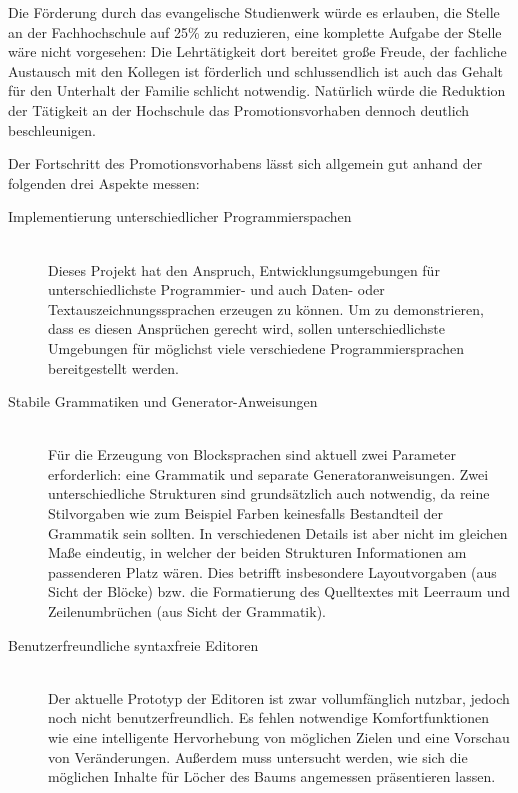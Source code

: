 \documentclass[paper=a4,fontsize=11pt,parskip=half]{scrartcl}
\begin{document}
Die Förderung durch das evangelische Studienwerk würde es erlauben, die Stelle an der Fachhochschule auf 25\% zu reduzieren, eine komplette Aufgabe der Stelle wäre nicht vorgesehen: Die Lehrtätigkeit dort bereitet große Freude, der fachliche Austausch mit den Kollegen ist förderlich und schlussendlich ist auch das Gehalt für den Unterhalt der Familie schlicht notwendig. Natürlich würde die Reduktion der Tätigkeit an der Hochschule das Promotionsvorhaben dennoch deutlich beschleunigen.

Der Fortschritt des Promotionsvorhabens lässt sich allgemein gut anhand der folgenden drei Aspekte messen:

\begin{description}
\item[Implementierung unterschiedlicher Programmierspachen] \hfill\\
  Dieses Projekt hat den Anspruch, Entwicklungsumgebungen für unterschiedlichste Programmier- und auch Daten- oder Textauszeichnungssprachen erzeugen zu können. Um zu demonstrieren, dass es diesen Ansprüchen gerecht wird, sollen unterschiedlichste Umgebungen für möglichst viele verschiedene Programmiersprachen bereitgestellt werden.

\item[Stabile Grammatiken und Generator-Anweisungen] \hfill\\
  Für die Erzeugung von Blocksprachen sind aktuell zwei Parameter erforderlich: eine Grammatik und separate Generatoranweisungen. Zwei unterschiedliche Strukturen sind grundsätzlich auch notwendig, da reine Stilvorgaben wie zum Beispiel Farben keinesfalls Bestandteil der Grammatik sein sollten. In verschiedenen Details ist aber nicht im gleichen Maße eindeutig, in welcher der beiden Strukturen Informationen am passenderen Platz wären. Dies betrifft insbesondere Layoutvorgaben (aus Sicht der Blöcke) bzw. die Formatierung des Quelltextes mit Leerraum und Zeilenumbrüchen (aus Sicht der Grammatik).

\item[Benutzerfreundliche syntaxfreie Editoren] \hfill\\
  Der aktuelle Prototyp der Editoren ist zwar vollumfänglich nutzbar, jedoch noch nicht benutzerfreundlich. Es fehlen notwendige Komfortfunktionen wie eine intelligente Hervorhebung von möglichen Zielen und eine Vorschau von Veränderungen. Außerdem muss untersucht werden, wie sich die möglichen Inhalte für Löcher des Baums angemessen präsentieren lassen.
\end{description}
\end{document}
